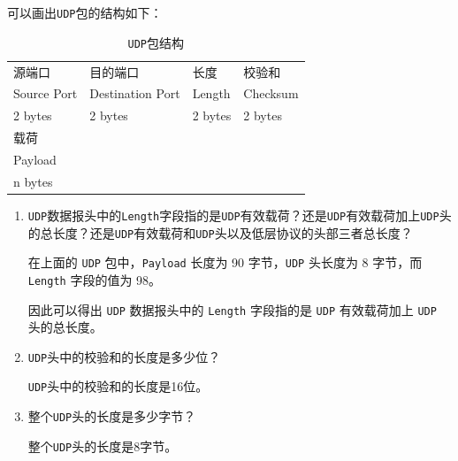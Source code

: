 \documentclass{article}
\begin{document}
可以画出\texttt{UDP}包的结构如下：

\begin{table}[H]
  \centering
  \begin{tabularx}{0.8\textwidth}{|*{8}{X|}}
    \hline
    \multicolumn{2}{|X|}{源端口}      & \multicolumn{2}{|X|}{目的端口}         & \multicolumn{2}{|X|}{长度}    & \multicolumn{2}{|X|}{校验和}   \\
    \multicolumn{2}{|X|}{Source Port} & \multicolumn{2}{|X|}{Destination Port} & \multicolumn{2}{|X|}{Length}  & \multicolumn{2}{|X|}{Checksum} \\
    \multicolumn{2}{|X|}{2 bytes}     & \multicolumn{2}{|X|}{2 bytes}          & \multicolumn{2}{|X|}{2 bytes} & \multicolumn{2}{|X|}{2 bytes}  \\
    \hline
    \multicolumn{8}{|X|}{载荷}                                                                                                                  \\
    \multicolumn{8}{|X|}{Payload}                                                                                                               \\
    \multicolumn{8}{|X|}{n bytes}                                                                                                               \\
    \hline
  \end{tabularx}
  \caption{\texttt{UDP}包结构}
\end{table}

\begin{enumerate}[label={\arabic*})]
  \item \texttt{UDP}数据报头中的\texttt{Length}字段指的是\texttt{UDP}有效载荷？还是\texttt{UDP}有效载荷加上\texttt{UDP}头的总长度？还是\texttt{UDP}有效载荷和\texttt{UDP}头以及低层协议的头部三者总长度？

        在上面的 \texttt{UDP} 包中，\texttt{Payload} 长度为 90 字节，\texttt{UDP} 头长度为 8 字节，而 \texttt{Length} 字段的值为 98。

        因此可以得出 \texttt{UDP} 数据报头中的 \texttt{Length} 字段指的是 \texttt{UDP} 有效载荷加上 \texttt{UDP} 头的总长度。

  \item \texttt{UDP}头中的校验和的长度是多少位？

        \texttt{UDP}头中的校验和的长度是16位。

  \item 整个\texttt{UDP}头的长度是多少字节？

        整个\texttt{UDP}头的长度是8字节。

\end{enumerate}
\end{document}
